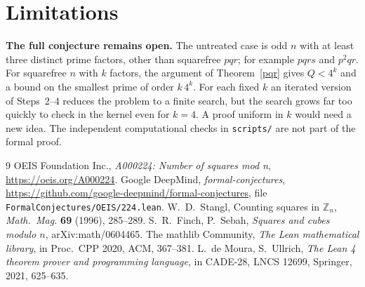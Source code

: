 \documentclass[11pt]{article}
\theoremstyle{remark}\newtheorem{remark}[theorem]{Remark}
\begin{document}
\section{Limitations}
\textbf{The full conjecture remains open.} The untreated case is odd $n$ with at least three distinct prime factors, other than squarefree $pqr$; for example $pqrs$ and $p^2qr$. For squarefree $n$ with $k$ factors, the argument of Theorem~\ref{pqr} gives $Q<4^k$ and a bound on the smallest prime of order $k\,4^k$. For each fixed $k$ an iterated version of Steps~2--4 reduces the problem to a finite search, but the search grows far too quickly to check in the kernel even for $k=4$. A proof uniform in $k$ would need a new idea. The independent computational checks in \texttt{scripts/} are not part of the formal proof.

\begin{thebibliography}{9}
 OEIS Foundation Inc., \emph{A000224: Number of squares mod n}, \url{https://oeis.org/A000224}.
 Google DeepMind, \emph{formal-conjectures}, \url{https://github.com/google-deepmind/formal-conjectures}, file \nolinkurl{FormalConjectures/OEIS/224.lean}.
 W.~D.~Stangl, Counting squares in $\mathbb{Z}_n$, \emph{Math.\ Mag.} \textbf{69} (1996), 285--289.
 S.~R.~Finch, P.~Sebah, \emph{Squares and cubes modulo $n$}, arXiv:math/0604465.
 The mathlib Community, \emph{The Lean mathematical library}, in Proc.\ CPP 2020, ACM, 367--381.
 L.~de Moura, S.~Ullrich, \emph{The Lean 4 theorem prover and programming language}, in CADE-28, LNCS 12699, Springer, 2021, 625--635.
\end{thebibliography}
\end{document}
